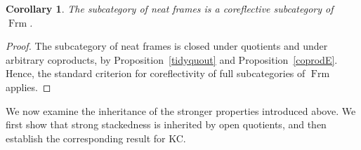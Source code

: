 \documentclass[11pt]{amsart}
\DeclareMathOperator{\Frm}{Frm}
\theoremstyle{plain}
\newtheorem{cor}[thm]{Corollary}
\theoremstyle{definition}
\begin{document}

\begin{cor}
The subcategory of neat frames is a coreflective subcategory of $\Frm$.
\end{cor}

\begin{proof}
The subcategory of neat frames is closed under quotients and under arbitrary coproducts, by
Proposition~\ref{tidyquout} and Proposition~\ref{coprodE}. Hence, the standard criterion 
for coreflectivity of full subcategories of \(\Frm\) applies.
\end{proof}

We now examine the inheritance of the stronger
properties introduced above. We first show that
strong stackedness is inherited by open quotients,
and then establish the corresponding result for KC.
\end{document}
